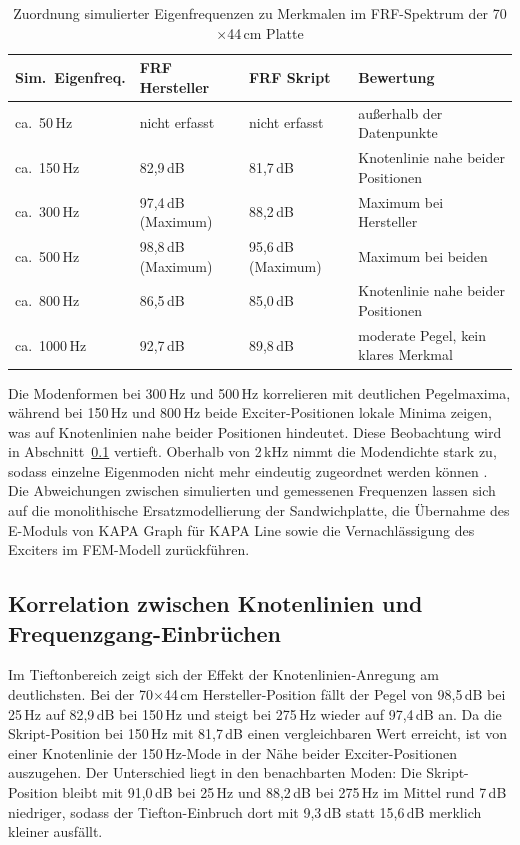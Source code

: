\begin{table}[H]
\centering
\caption{Zuordnung simulierter Eigenfrequenzen zu Merkmalen im FRF-Spektrum der 70$\times$44\,cm Platte}
\label{tab:eigenfrequenz_vergleich}
\begin{tabularx}{\textwidth}{|l|X|X|X|}
\hline
\textbf{Sim.\ Eigenfreq.} & \textbf{FRF Hersteller} & \textbf{FRF Skript} & \textbf{Bewertung} \\
\hline
ca.\ 50\,Hz & nicht erfasst & nicht erfasst & außerhalb der Datenpunkte \\
\hline
ca.\ 150\,Hz & 82,9\,dB & 81,7\,dB & Knotenlinie nahe beider Positionen \\
\hline
ca.\ 300\,Hz & 97,4\,dB (Maximum) & 88,2\,dB & Maximum bei Hersteller \\
\hline
ca.\ 500\,Hz & 98,8\,dB (Maximum) & 95,6\,dB (Maximum) & Maximum bei beiden \\
\hline
ca.\ 800\,Hz & 86,5\,dB & 85,0\,dB & Knotenlinie nahe beider Positionen \\
\hline
ca.\ 1000\,Hz & 92,7\,dB & 89,8\,dB & moderate Pegel, kein klares Merkmal \\
\hline
\end{tabularx}
\end{table}

Die Modenformen bei 300\,Hz und 500\,Hz korrelieren mit deutlichen Pegelmaxima, während bei 150\,Hz und 800\,Hz beide Exciter-Positionen lokale Minima zeigen, was auf Knotenlinien nahe beider Positionen hindeutet. Diese Beobachtung wird in Abschnitt~\ref{subsec:knotenlinien} vertieft. Oberhalb von 2\,kHz nimmt die Modendichte stark zu, sodass einzelne Eigenmoden nicht mehr eindeutig zugeordnet werden können \cite{Cremer1996}. Die Abweichungen zwischen simulierten und gemessenen Frequenzen lassen sich auf die monolithische Ersatzmodellierung der Sandwichplatte, die Übernahme des E-Moduls von KAPA Graph für KAPA Line sowie die Vernachlässigung des Exciters im FEM-Modell zurückführen.

\subsection{Korrelation zwischen Knotenlinien und Frequenzgang-Einbrüchen}
\label{subsec:knotenlinien}

Im Tieftonbereich zeigt sich der Effekt der Knotenlinien-Anregung am deutlichsten. Bei der 70$\times$44\,cm Hersteller-Position fällt der Pegel von 98,5\,dB bei 25\,Hz auf 82,9\,dB bei 150\,Hz und steigt bei 275\,Hz wieder auf 97,4\,dB an. Da die Skript-Position bei 150\,Hz mit 81,7\,dB einen vergleichbaren Wert erreicht, ist von einer Knotenlinie der 150\,Hz-Mode in der Nähe beider Exciter-Positionen auszugehen. Der Unterschied liegt in den benachbarten Moden: Die Skript-Position bleibt mit 91,0\,dB bei 25\,Hz und 88,2\,dB bei 275\,Hz im Mittel rund 7\,dB niedriger, sodass der Tiefton-Einbruch dort mit 9,3\,dB statt 15,6\,dB merklich kleiner ausfällt.

